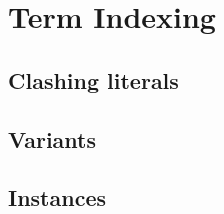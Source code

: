 \section{Term Indexing}

\subsection{Clashing literals}

\subsection{Variants}

\subsection{Instances}



